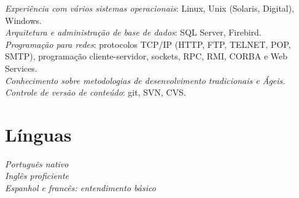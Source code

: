 \documentclass[10pt]{article} %
\begin{document}

{
\textit{Experiência com vários sistemas operacionais}: Linux, Unix (Solaris, Digital), Windows. \\
\textit{Arquitetura e administração de base de dados}: SQL Server, Firebird. \\
\textit{Programação para redes}: protocolos TCP/IP (HTTP, FTP, TELNET, POP, SMTP), programação cliente-servidor, sockets, RPC, RMI, CORBA e Web Services. \\
\textit{Conhecimento sobre metodologias de desenvolvimento tradicionais e Ágeis.} \\
\textit{Controle de versão de conteúdo}: git, SVN, CVS. \\
}


\section{Línguas}

\textit{Português nativo} \\
\textit{Inglês proficiente} \\
\textit{Espanhol e francês: entendimento básico} \\
\end{document}

